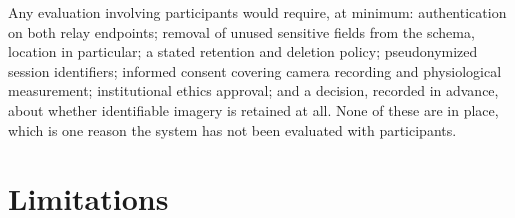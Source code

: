 \documentclass[11pt,a4paper]{article}
\begin{document}
Any evaluation involving participants would require, at minimum: authentication
on both relay endpoints; removal of unused sensitive fields from the schema,
location in particular; a stated retention and deletion policy; pseudonymized
session identifiers; informed consent covering camera recording and physiological
measurement; institutional ethics approval; and a decision, recorded in advance,
about whether identifiable imagery is retained at all. None of these are in place,
which is one reason the system has not been evaluated with participants.

\section{Limitations}
\label{sec:limitations}
\end{document}
